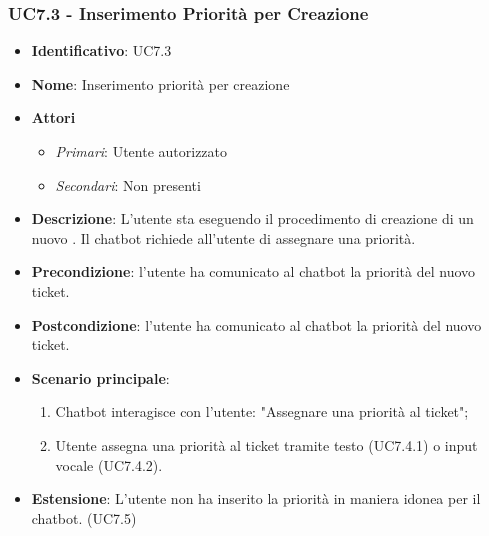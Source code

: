   \subsubsection{UC7.3 - Inserimento Priorità per Creazione }
\begin{itemize}
	\item \textbf{Identificativo}: UC7.3
	\item \textbf{Nome}: Inserimento priorità per creazione 
	\item \textbf{Attori}
	\begin{itemize} 
		\item \textit{Primari}: Utente autorizzato
		\item \textit{Secondari}: Non presenti
	\end{itemize}
	\item \textbf{Descrizione}: L'utente sta eseguendo il procedimento di creazione di un nuovo . Il chatbot richiede all'utente di assegnare una priorità.
	\item \textbf{Precondizione}: l'utente ha comunicato al chatbot la priorità del nuovo ticket.
	\item \textbf{Postcondizione}: l'utente ha comunicato al chatbot la priorità del nuovo ticket.
	\item \textbf{Scenario principale}: \begin{enumerate}
		\item Chatbot interagisce con l'utente: "Assegnare una priorità al ticket";
		\item Utente assegna una priorità al ticket tramite testo (UC7.4.1) o input vocale (UC7.4.2).
	\end{enumerate}
	\item \textbf{Estensione}: L'utente non ha inserito la priorità in maniera idonea per il chatbot. (UC7.5)
\end{itemize}

